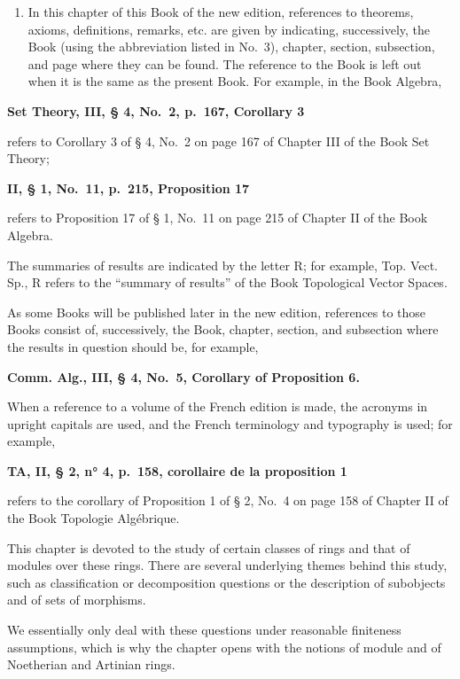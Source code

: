 \begin{enumerate}
\def\labelenumi{\arabic{enumi}.}
\setcounter{enumi}{11}
\tightlist
\item
  In this chapter of this Book of the new edition, references to theorems, axioms, definitions, remarks, etc. are given by indicating, successively, the Book (using the abbreviation listed in No.~3), chapter, section, subsection, and page where they can be found. The reference to the Book is left out when it is the same as the present Book. For example, in the Book Algebra,
\end{enumerate}

\textbf{Set Theory, III, § 4, No.~2, p.~167, Corollary 3}

refers to Corollary 3 of § 4, No.~2 on page 167 of Chapter III of the Book Set Theory;

\textbf{II, § 1, No.~11, p.~215, Proposition 17}

refers to Proposition 17 of § 1, No.~11 on page 215 of Chapter II of the Book Algebra.

The summaries of results are indicated by the letter R; for example, Top. Vect. Sp., R refers to the ``summary of results'' of the Book Topological Vector Spaces.

As some Books will be published later in the new edition, references to those Books consist of, successively, the Book, chapter, section, and subsection where the results in question should be, for example,

\textbf{Comm. Alg., III, § 4, No.~5, Corollary of Proposition 6.}

When a reference to a volume of the French edition is made, the acronyms in upright capitals are used, and the French terminology and typography is used; for example,

\textbf{TA, II, § 2, n° 4, p.~158, corollaire de la proposition 1}

refers to the corollary of Proposition 1 of § 2, No.~4 on page 158 of Chapter II of the Book Topologie Algébrique.


This chapter is devoted to the study of certain classes of rings and that of modules over these rings. There are several underlying themes behind this study, such as classification or decomposition questions or the description of subobjects and of sets of morphisms.

We essentially only deal with these questions under reasonable finiteness assumptions, which is why the chapter opens with the notions of module and of Noetherian and Artinian rings.

